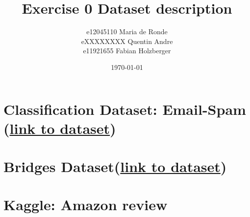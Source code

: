 \documentclass[11pt]{article}
\title{Exercise 0 Dataset description}
\author{e12045110 Maria de Ronde \\ eXXXXXXXX  Quentin Andre  \\ e11921655 Fabian Holzberger}
\date{\today}
\begin{document}
\graphicspath{{./figures/}}
\maketitle

\newpage
%
\section{Classification Dataset: Email-Spam (\href{https://www.kaggle.com/nitishabharathi/email-spam-dataset?select=enronSpamSubset.csv}{link to dataset})}


\section{Bridges Dataset(\href{https://archive.ics.uci.edu/ml/datasets/Pittsburgh+Bridges}{link to dataset})}





\section{Kaggle: Amazon review}
\end{document}
